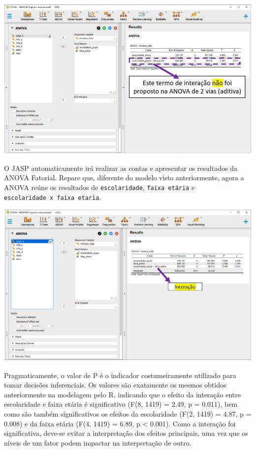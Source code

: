 \documentclass[
]{book}
\begin{document}
\includegraphics{./img/cap_anova_two_way_execucao.png}

O JASP automaticamente irá realizar as contas e apresentar os resultados
da ANOVA Fatorial. Repare que, diferente do modelo visto anteriormente,
agora a ANOVA reúne os resultados de \texttt{escolaridade},
\texttt{faixa\ etária} e \texttt{escolaridade\ x\ faixa\ etaria}.

\includegraphics{./img/cap_anova_fatorial_resultados1.png}

Pragmaticamente, o valor de P é o indicador costumeiramente utilizado
para tomar decisões inferenciais. Os valores são exatamente os mesmos
obtidos anteriormente na modelagem pelo R, indicando que o efeito da
interação entre escolaridade e faixa etária é significativo (F(8, 1419)
= 2.49, p = 0.011), bem como são também significativos os efeitos da
escolaridade (F(2, 1419) = 4.87, p = 0.008) e da faixa etária (F(4,
1419) = 6.89, p \textless{} 0.001). Como a interação foi significativa,
deve-se evitar a interpretação dos efeitos principais, uma vez que os
níveis de um fator podem impactar na interpretação de outro.
\end{document}
